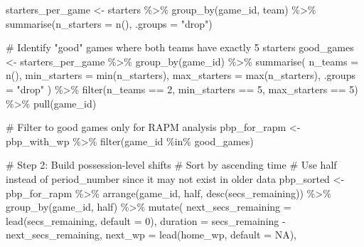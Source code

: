 \documentclass[
  letterpaper,
  DIV=11,
  numbers=noendperiod]{scrartcl}
\newenvironment{Shaded}{\begin{snugshade}}{\end{snugshade}}
\newcommand{\AttributeTok}[1]{\textcolor[rgb]{0.40,0.45,0.13}{#1}}
\newcommand{\CommentTok}[1]{\textcolor[rgb]{0.37,0.37,0.37}{#1}}
\newcommand{\ConstantTok}[1]{\textcolor[rgb]{0.56,0.35,0.01}{#1}}
\newcommand{\DecValTok}[1]{\textcolor[rgb]{0.68,0.00,0.00}{#1}}
\newcommand{\FunctionTok}[1]{\textcolor[rgb]{0.28,0.35,0.67}{#1}}
\newcommand{\NormalTok}[1]{\textcolor[rgb]{0.00,0.23,0.31}{#1}}
\newcommand{\OtherTok}[1]{\textcolor[rgb]{0.00,0.23,0.31}{#1}}
\newcommand{\SpecialCharTok}[1]{\textcolor[rgb]{0.37,0.37,0.37}{#1}}
\newcommand{\StringTok}[1]{\textcolor[rgb]{0.13,0.47,0.30}{#1}}
\begin{document}
\begin{Shaded}
\begin{Highlighting}[]
\NormalTok{starters\_per\_game }\OtherTok{\textless{}{-}}\NormalTok{ starters }\SpecialCharTok{\%\textgreater{}\%}
  \FunctionTok{group\_by}\NormalTok{(game\_id, team) }\SpecialCharTok{\%\textgreater{}\%}
  \FunctionTok{summarise}\NormalTok{(}\AttributeTok{n\_starters =} \FunctionTok{n}\NormalTok{(), }\AttributeTok{.groups =} \StringTok{"drop"}\NormalTok{)}

\CommentTok{\# Identify "good" games where both teams have exactly 5 starters}
\NormalTok{good\_games }\OtherTok{\textless{}{-}}\NormalTok{ starters\_per\_game }\SpecialCharTok{\%\textgreater{}\%}
  \FunctionTok{group\_by}\NormalTok{(game\_id) }\SpecialCharTok{\%\textgreater{}\%}
  \FunctionTok{summarise}\NormalTok{(}
    \AttributeTok{n\_teams =} \FunctionTok{n}\NormalTok{(),}
    \AttributeTok{min\_starters =} \FunctionTok{min}\NormalTok{(n\_starters),}
    \AttributeTok{max\_starters =} \FunctionTok{max}\NormalTok{(n\_starters),}
    \AttributeTok{.groups =} \StringTok{"drop"}
\NormalTok{  ) }\SpecialCharTok{\%\textgreater{}\%}
  \FunctionTok{filter}\NormalTok{(n\_teams }\SpecialCharTok{==} \DecValTok{2}\NormalTok{, min\_starters }\SpecialCharTok{==} \DecValTok{5}\NormalTok{, max\_starters }\SpecialCharTok{==} \DecValTok{5}\NormalTok{) }\SpecialCharTok{\%\textgreater{}\%}
  \FunctionTok{pull}\NormalTok{(game\_id)}


\CommentTok{\# Filter to good games only for RAPM analysis}
\NormalTok{pbp\_for\_rapm }\OtherTok{\textless{}{-}}\NormalTok{ pbp\_with\_wp }\SpecialCharTok{\%\textgreater{}\%}
  \FunctionTok{filter}\NormalTok{(game\_id }\SpecialCharTok{\%in\%}\NormalTok{ good\_games)}


\CommentTok{\# Step 2: Build possession{-}level shifts}
\CommentTok{\# Sort by ascending time }
\CommentTok{\# Use half instead of period\_number since it may not exist in older data}
\NormalTok{pbp\_sorted }\OtherTok{\textless{}{-}}\NormalTok{ pbp\_for\_rapm }\SpecialCharTok{\%\textgreater{}\%}
  \FunctionTok{arrange}\NormalTok{(game\_id, half, }\FunctionTok{desc}\NormalTok{(secs\_remaining)) }\SpecialCharTok{\%\textgreater{}\%}
  \FunctionTok{group\_by}\NormalTok{(game\_id, half) }\SpecialCharTok{\%\textgreater{}\%}
  \FunctionTok{mutate}\NormalTok{(}
    \AttributeTok{next\_secs\_remaining =} \FunctionTok{lead}\NormalTok{(secs\_remaining, }\AttributeTok{default =} \DecValTok{0}\NormalTok{),}
    \AttributeTok{duration =}\NormalTok{ secs\_remaining }\SpecialCharTok{{-}}\NormalTok{ next\_secs\_remaining,}
    \AttributeTok{next\_wp =} \FunctionTok{lead}\NormalTok{(home\_wp, }\AttributeTok{default =} \ConstantTok{NA}\NormalTok{),}


\end{Highlighting}
\end{Shaded}
\end{document}
